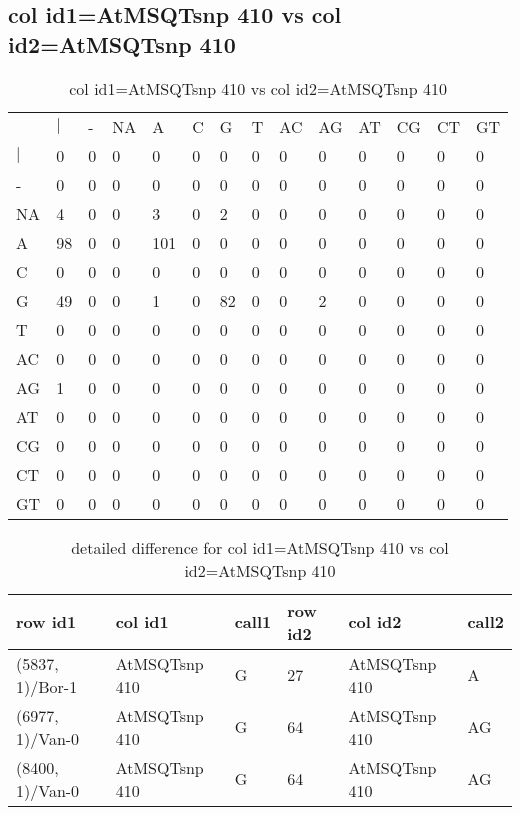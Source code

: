 \subsection{col id1=AtMSQTsnp 410 vs col id2=AtMSQTsnp 410}
\begin{center}
\begin{longtable}{|l|l|l|l|l|l|l|l|l|l|l|l|l|l|}
\caption{col id1=AtMSQTsnp 410 vs col id2=AtMSQTsnp 410} \label{table_dm930}\\
\hline
\\
\hline
&$|$&-&NA&A&C&G&T&AC&AG&AT&CG&CT&GT\\
$|$&0&0&0&0&0&0&0&0&0&0&0&0&0\\
-&0&0&0&0&0&0&0&0&0&0&0&0&0\\
NA&4&0&0&3&0&2&0&0&0&0&0&0&0\\
A&98&0&0&101&0&0&0&0&0&0&0&0&0\\
C&0&0&0&0&0&0&0&0&0&0&0&0&0\\
G&49&0&0&1&0&82&0&0&2&0&0&0&0\\
T&0&0&0&0&0&0&0&0&0&0&0&0&0\\
AC&0&0&0&0&0&0&0&0&0&0&0&0&0\\
AG&1&0&0&0&0&0&0&0&0&0&0&0&0\\
AT&0&0&0&0&0&0&0&0&0&0&0&0&0\\
CG&0&0&0&0&0&0&0&0&0&0&0&0&0\\
CT&0&0&0&0&0&0&0&0&0&0&0&0&0\\
GT&0&0&0&0&0&0&0&0&0&0&0&0&0\\
\hline
\end{longtable}
\end{center}

\begin{center}
\begin{longtable}{|l|l|l|l|l|l|}
\caption{detailed difference for col id1=AtMSQTsnp 410 vs col id2=AtMSQTsnp 410} \label{table_dm931}\\
\hline
row id1&col id1&call1&row id2&col id2&call2\\
\hline
(5837, 1)/Bor-1&AtMSQTsnp 410&G&27&AtMSQTsnp 410&A\\
(6977, 1)/Van-0&AtMSQTsnp 410&G&64&AtMSQTsnp 410&AG\\
(8400, 1)/Van-0&AtMSQTsnp 410&G&64&AtMSQTsnp 410&AG\\
\hline
\end{longtable}
\end{center}

